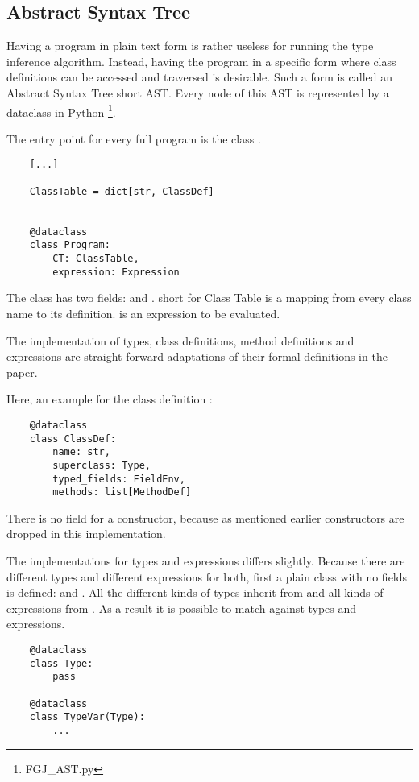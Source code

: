 \subsection{Abstract Syntax Tree}

Having a program in plain text form is rather useless for running the type inference algorithm. Instead, having the program in a specific form where class definitions can be accessed and traversed is desirable.
Such a form is called an Abstract Syntax Tree short AST. Every node of this AST is represented by a dataclass in Python \footnote{FGJ\_AST.py}.

The entry point for every full program is the class .
\begin{verbatim}
    [...]

    ClassTable = dict[str, ClassDef]


    @dataclass
    class Program:
        CT: ClassTable,
        expression: Expression
\end{verbatim}

The class  has two fields:  and .  short for Class Table is a mapping from every class name to its definition.  is an expression to be evaluated.

The implementation of types, class definitions, method definitions and expressions are straight forward adaptations of their formal definitions in the paper.

Here, an example for the class definition :
\begin{verbatim}
    @dataclass
    class ClassDef:
        name: str,
        superclass: Type,
        typed_fields: FieldEnv,
        methods: list[MethodDef]
\end{verbatim}

There is no field for a constructor, because as mentioned earlier constructors are dropped in this implementation.

The implementations for types and expressions differs slightly. Because there are different types and different expressions for both, first a plain class with no fields is defined:  and . All the different kinds of types inherit from  and all kinds of expressions from .
As a result it is possible to match against types and expressions.

\begin{verbatim}
    @dataclass
    class Type:
        pass

    @dataclass
    class TypeVar(Type):
        ...
\end{verbatim}

